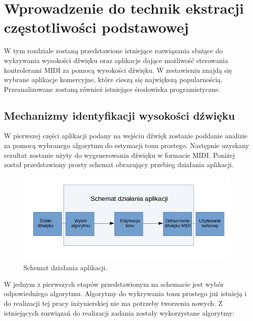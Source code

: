 \chapter{{Wprowadzenie do technik ekstracji częstotliwości podstawowej}}
\label{chapter:przeglad}
\thispagestyle{empty}

W tym rozdziale zostaną przedstawione istniejące rozwiązania służące do wykrywania wysokości dźwięku oraz aplikacje dające możliwość sterowania kontrolerami MIDI za pomocą wysokości dźwięku. W zestawieniu znajdą się wybrane aplikacje komercyjne, które cieszą się największą popularnością. Przeanalizowane zostaną również istniejące środowiska programistyczne.

\section{{Mechanizmy identyfikacji wysokości dźwięku}}
 W pierwszej części aplikacji podany na wejściu dźwięk zostanie poddanie analizie za pomocą wybranego algorytmu do estymacji tonu prostego. Następnie uzyskany rezultat zostanie użyty do wygenerowania dźwięku w formacie MIDI. Poniżej został przedstawiony prosty schemat obrazujący przebieg działania aplikacji.
 
 
 \begin{figure}[h!]
  \centering
  \includegraphics[width=0.5\linewidth]{rys/schematAplikacji}
  \caption{Schemat działania aplikacji.}
  \label{fig:schemat}
\end{figure}


W jednym z pierwszych etapów przedstawionym na schemacie jest wybór odpowiedniego algorytmu. Algorytmy do wykrywania tonu prostego już istnieją i do realizacji tej pracy inżynierskiej nie ma potrzeby tworzenia nowych. Z istniejących rozwiązań do realizacji zadania zostały wykorzystane algorytmy:

